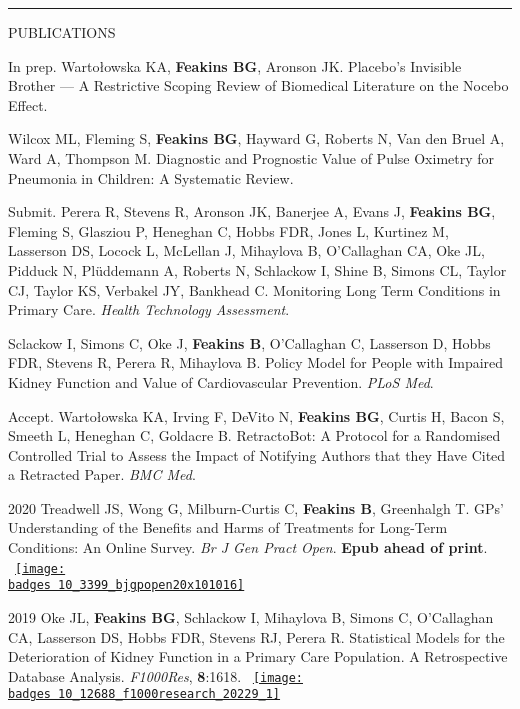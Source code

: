 \documentclass[10pt,a4paper]{article}
\def\badges{./badges/}
\begin{document}
\noindent\rule{\textwidth}{0.4pt}
\begin{cvlist}{PUBLICATIONS}
	
	\item[In prep.]
	Warto\l{}owska KA, \textbf{Feakins BG}, Aronson JK. Placebo’s Invisible Brother --- A Restrictive Scoping Review of Biomedical Literature on the Nocebo Effect.
	
	\item[]
	Wilcox ML, Fleming S, \textbf{Feakins BG}, Hayward G, Roberts N, Van den Bruel A, Ward A, Thompson M. Diagnostic and Prognostic Value of Pulse Oximetry for Pneumonia in Children: A Systematic Review.
	
	\item[Submit.]
	Perera R, Stevens R, Aronson JK, Banerjee A, Evans J, \textbf{Feakins BG}, Fleming S, Glasziou P, Heneghan C, Hobbs FDR, Jones L, Kurtinez M, Lasserson DS, Locock L, McLellan J, Mihaylova B, O'Callaghan CA, Oke JL, Pidduck N, Pl\"uddemann A, Roberts N, Schlackow I, Shine B, Simons CL, Taylor CJ, Taylor KS, Verbakel JY, Bankhead C. Monitoring Long Term Conditions in Primary Care. \textit{Health Technology Assessment}.
	
	\item[]
	Sclackow I, Simons C, Oke J, \textbf{Feakins B}, O'Callaghan C, Lasserson D, Hobbs FDR, Stevens R, Perera R, Mihaylova B. Policy Model for People with Impaired Kidney Function and Value of Cardiovascular Prevention. \textit{PLoS Med}.
	
	\item[Accept.]
	Warto\l{}owska KA, Irving F, DeVito N, \textbf{Feakins BG}, Curtis H, Bacon S, Smeeth L, Heneghan C, Goldacre B. RetractoBot: A Protocol for a Randomised Controlled Trial to Assess the Impact of Notifying Authors that they Have Cited a Retracted Paper. \textit{BMC Med}. 
	
	\item[2020]
	Treadwell JS, Wong G, Milburn-Curtis C, \textbf{Feakins B}, Greenhalgh T. GPs' Understanding of the Benefits and Harms of Treatments for Long-Term Conditions: An Online Survey. \textit{Br J Gen Pract Open}. \textbf{Epub ahead of print}. ~\href{https://www.altmetric.com/details/77018222}{\texttt{[image: \\badges 10\_3399\_bjgpopen20x101016]}}
	
	\item[2019]
	Oke JL, \textbf{Feakins BG}, Schlackow I, Mihaylova B, Simons C, O'Callaghan CA, Lasserson DS, Hobbs FDR, Stevens RJ, Perera R. Statistical Models for the Deterioration of Kidney Function in a Primary Care Population. A Retrospective Database Analysis. \textit{F1000Res}, \textbf{8}:1618. ~\href{https://f1000research.altmetric.com/details/66389361}{\texttt{[image: \\badges 10\_12688\_f1000research\_20229\_1]}}
	

\end{cvlist}
\end{document}
